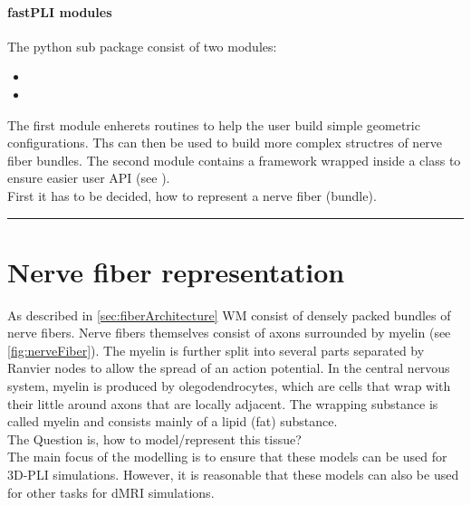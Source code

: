 \paragraph{\ac{fastPLI} modules}
% 
The python sub package  consist of two modules:
% 
\begin{itemize}[nosep]
    \item {}
    \item {}
\end{itemize}
% 
The first module  enherets routines to help the user build simple geometric configurations.
Ths can then be used to build more complex structres of nerve fiber bundles.
The second module  contains a \CXX framework wrapped inside a \python class to ensure easier user \ac{API} (see \dummy).
\\
% 
First it has to be decided, how to represent a nerve fiber (bundle).
% 
\vspace{5pt}
\hrule
\vspace{6pt}
% 
\section{Nerve fiber representation}
\label{sec:nerve_fiber_representation}
% 
As described in \cref{sec:fiberArchitecture} \ac{WM} consist of densely packed bundles of nerve fibers.
Nerve fibers themselves consist of axons surrounded by myelin (see \cref{fig:nerveFiber}).
The myelin is further split into several parts separated by Ranvier nodes to allow the spread of an action potential.
In the central nervous system, myelin is produced by olegodendrocytes, which are cells that wrap with their little  around axons that are locally adjacent.
The wrapping substance is called myelin and consists mainly of a lipid (fat) substance.
\\
% 
The Question is, how to model/represent this tissue?
\\
% 
The main focus of the modelling is to ensure that these models can be used for \ac{3D-PLI} simulations.
However, it is reasonable that these models can also be used for other tasks \eg for \ac{dMRI} simulations.
% 
